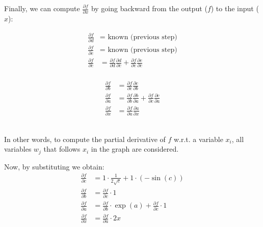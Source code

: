 \begin{example}
    Finally, we can compute $\frac{\partial f}{\partial x}$ by going backward from the output ($f$) to the input ($x$):\\
    \begin{minipage}{.5\linewidth}
        \[
            \begin{split}
                \frac{\partial f}{\partial d} &= \text{ known (previous step)} \\
                \frac{\partial f}{\partial e} &= \text{ known (previous step)} \\
                \frac{\partial f}{\partial c} &= 
                    \frac{\partial f}{\partial d}\frac{\partial d}{\partial c} + \frac{\partial f}{\partial e}\frac{\partial e}{\partial c} \\
            \end{split}
        \]
    \end{minipage}%
    \begin{minipage}{.5\linewidth}
        \[
            \begin{split}
                \frac{\partial f}{\partial b} &= \frac{\partial f}{\partial c}\frac{\partial c}{\partial b} \\
                \frac{\partial f}{\partial a} &= 
                    \frac{\partial f}{\partial b}\frac{\partial b}{\partial a} + \frac{\partial f}{\partial c}\frac{\partial c}{\partial a} \\
                \frac{\partial f}{\partial x} &= \frac{\partial f}{\partial a}\frac{\partial a}{\partial x}                    
            \end{split}
        \]
    \end{minipage}\\

    In other words, to compute the partial derivative of $f$ w.r.t. a variable $x_i$, 
    all variables $w_j$ that follows $x_i$ in the graph are considered.

    Now, by substituting we obtain:
    \[
        \begin{split}
        \frac{\partial f}{\partial c} &= 1 \cdot \frac{1}{2\sqrt{c}} + 1 \cdot (-\sin(c)) \\
        \frac{\partial f}{\partial b} &= \frac{\partial f}{\partial c} \cdot 1 \\
        \frac{\partial f}{\partial a} &= \frac{\partial f}{\partial b} \cdot \exp(a) + \frac{\partial f}{\partial c} \cdot 1 \\
        \frac{\partial f}{\partial x} &= \frac{\partial f}{\partial a} \cdot 2x
        \end{split}
    \] 
\end{example}